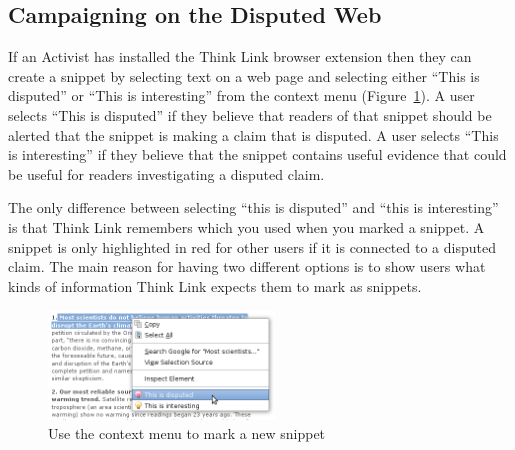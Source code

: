\documentclass{chi2009}
\newcommand{\todo}[1]{}
\begin{document}
\todo{Talk about searches}
\todo{Cite work on collaborative filtering}
\todo{Mention the sidebar?}


\subsection{Campaigning on the Disputed Web}

If an Activist has installed the Think Link browser extension then they can create a snippet by selecting text on a web page and selecting either ``This is disputed'' or ``This is interesting'' from the context menu (Figure~\ref{createprocess}). A user selects ``This is disputed'' if they believe that readers of that snippet should be alerted that the snippet is making a claim that is disputed. A user selects ``This is interesting'' if they believe that the snippet contains useful evidence that could be useful for readers investigating a disputed claim. 

The only difference between selecting ``this is disputed'' and ``this is interesting'' is that Think Link remembers which you used when you marked a snippet. A snippet is only highlighted in red for other users if it is connected to a disputed claim. The main reason for having two different options is to show users what kinds of information Think Link expects them to mark as snippets.
\todo{Say something smart about the difference}

\begin{figure}[tb]
	\begin{center}
	\includegraphics[width=6cm]{../screenshots/v2_snipmark.png}
	\caption{Use the context menu to mark a new snippet}
	\label{createprocess}
	\end{center}
\end{figure}
\end{document}
